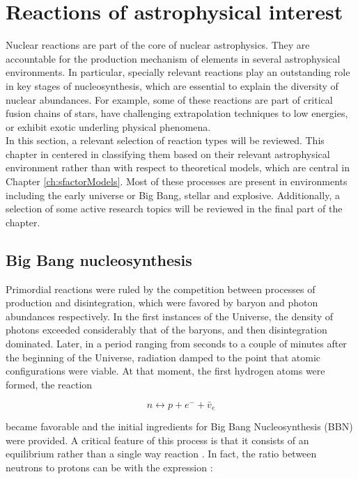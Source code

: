 \documentclass[openany]{book}
\begin{document}
\chapter{Reactions of astrophysical interest}  \label{ch:reactionsInterest}

Nuclear reactions are part of the core of nuclear astrophysics. They are accountable for the production mechanism of elements in several astrophysical environments. In particular, specially relevant reactions play an outstanding role in key stages of nucleosynthesis, which are essential to explain the diversity of nuclear abundances. For example, some of these reactions are part of critical fusion chains of stars, have challenging extrapolation techniques to low energies, or exhibit exotic underling physical phenomena. \\

In this section, a relevant selection of reaction types will be reviewed. This chapter in centered in classifying them based on their relevant astrophysical environment rather than with respect to theoretical models, which are central in Chapter \ref{ch:sfactorModels}. Most of these processes are present in environments including the early universe or Big Bang, stellar and explosive. Additionally, a selection of some active research topics will be reviewed in the final part of the chapter. 

\section{Big Bang nucleosynthesis} \label{sec:BBN}

Primordial reactions were ruled by the competition between processes of production and disintegration, which were favored by baryon and photon abundances respectively. In the first instances of the Universe, the density of photons exceeded considerably that of the baryons, and then disintegration dominated. Later, in a period ranging from seconds to a couple of minutes after the beginning of the Universe, radiation damped to the point that atomic configurations were viable. At that moment, the first hydrogen atoms were formed, the reaction

\begin{equation} \label{eq:reaction_BBN_nEqp}
	n \leftrightarrow p + e^{-} + \bar v_{e}
\end{equation}

became favorable and the initial ingredients for Big Bang Nucleosynthesis (BBN) were provided. A critical feature of this process is that it consists of an equilibrium rather than a single way reaction \cite{coc_vangioni_2010}. In fact, the ratio between neutrons to protons can be with the expression \cite{patrignani_et_particle-data-group_2016}:
\end{document}
